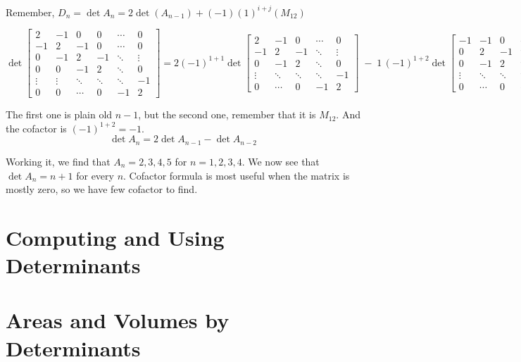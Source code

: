 Remember, \(D_n = \det A_n = 2 \det(A_{n-1}) + (-1) (1)^{i+j} (M_{12} )\)

\[
\det\!\begin{bmatrix}
2 & -1 & 0 & 0 & \cdots & 0\\
-1 & 2 & -1 & 0 & \cdots & 0\\
0 & -1 & 2 & -1 & \ddots & \vdots\\
0 & 0 & -1 & 2 & \ddots & 0\\
\vdots & \vdots & \ddots & \ddots & \ddots & -1\\
0 & 0 & \cdots & 0 & -1 & 2
\end{bmatrix}
=
2(-1)^{1+1}\!
\det\!\begin{bmatrix}
2 & -1 & 0 & \cdots & 0\\
-1 & 2 & -1 & \ddots & \vdots\\
0 & -1 & 2 & \ddots & 0\\
\vdots & \ddots & \ddots & \ddots & -1\\
0 & \cdots & 0 & -1 & 2
\end{bmatrix}
\;-\;
1\,(-1)^{1+2}\!
\det\!\begin{bmatrix}
-1 & -1 & 0 & \cdots & 0\\
0 & 2 & -1 & \ddots & \vdots\\
0 & -1 & 2 & \ddots & 0\\
\vdots & \ddots & \ddots & \ddots & -1\\
0 & \cdots & 0 & -1 & 2
\end{bmatrix}.
\]


The first one is plain old \(n - 1\), but the second one, remember that it is \(M_{12} \). And the cofactor is \((-1)^{1+2} = -1\). 
\[
  \det  A_n = 2 \det A_{n-1} - \det A_{n-2}  
\]   

Working it, we find that \(A_n = 2, 3, 4, 5\) for \(n = 1, 2, 3, 4\). We now see that \(\det A_n = n + 1\) for every \(n\). Cofactor formula is most useful when the matrix is mostly zero, so we have few cofactor to find.     

\section{Computing and Using Determinants}



\section{Areas and Volumes by Determinants}


